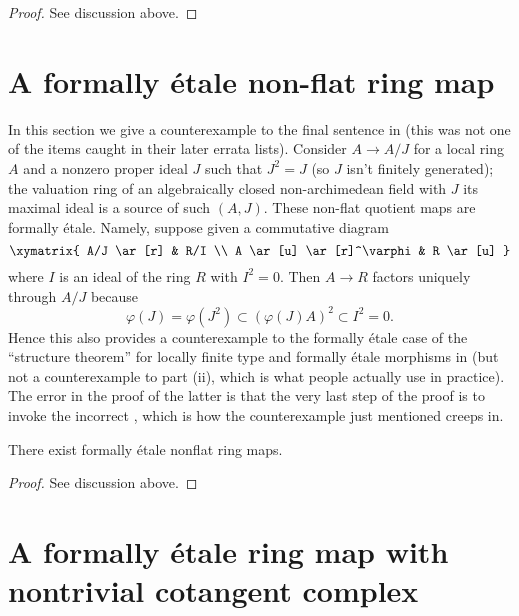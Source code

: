 \begin{proof}
See discussion above.
\end{proof}


\section{A formally \'etale non-flat ring map}
\label{section-formally-etale-nonflat}

\noindent
In this section we give a counterexample to the final sentence in
\cite[0, Example 19.10.3(i)]{EGA} (this was not one of the items caught
in their later errata lists). Consider $A \to A/J$ for a local ring $A$
and a nonzero proper ideal $J$ such that $J^2 = J$ (so $J$ isn't finitely
generated); the valuation ring of an algebraically closed non-archimedean
field with $J$ its maximal ideal is a source of such $(A, J)$. These
non-flat quotient maps are formally \'etale. Namely, suppose given a
commutative diagram
$$
\xymatrix{
A/J \ar[r] & R/I \\
A \ar[u] \ar[r]^\varphi & R \ar[u]
}
$$
where $I$ is an ideal of the ring $R$ with $I^2 = 0$. Then $A \to R$
factors uniquely through $A/J$ because
$$
\varphi(J) = \varphi(J^2) \subset (\varphi(J)A)^2 \subset I^2 = 0.
$$
Hence this also provides a counterexample to the formally \'etale case
of the ``structure theorem'' for locally finite type and formally \'etale
morphisms in \cite[IV, Theorem 18.4.6(i)]{EGA}
(but not a counterexample to part (ii), which
is what people actually use in practice). The error in the proof of
the latter is that the very last step of the proof is to invoke the incorrect
\cite[0, Example 19.3.10(i)]{EGA},
which is how the counterexample just mentioned creeps in.

\begin{lemma}
\label{lemma-formally-etale-not-presented}
There exist formally \'etale nonflat ring maps.
\end{lemma}

\begin{proof}
See discussion above.
\end{proof}



\section{A formally \'etale ring map with nontrivial cotangent complex}
\label{section-formally-etale-nontrivial-cotangent-complex}


